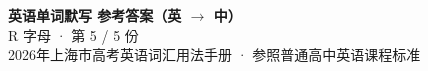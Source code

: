 \documentclass[10pt,a4paper]{article}
\begin{document}
\pagestyle{plain}

\begin{center}
{\LARGE\bfseries 英语单词默写 \quad 参考答案（英 $\to$ 中）}\\[0.22em]
{\large R 字母 · 第 5 / 5 份}\\[0.18em]
{\small 2026年上海市高考英语词汇用法手册 · 参照普通高中英语课程标准}
\end{center}

\vspace{0.2em}
\noindent{\color{rulegray}\rule{\textwidth}{0.8pt}}

\vspace{0.35em}

\vspace{0.25em}
\renewcommand{\arraystretch}{1.32}
\end{document}
